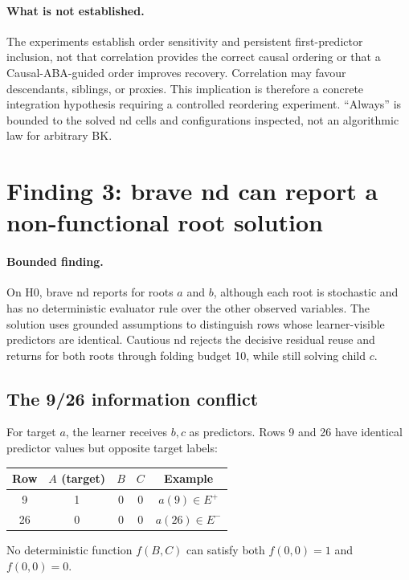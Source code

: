 \documentclass[11pt]{article}
\DeclareRobustCommand{\code}[1]{\texttt{\detokenize{#1}}}
\newcommand{\Epos}{E^{+}}
\newcommand{\Eneg}{E^{-}}
\newcommand{\finding}{\paragraph{Bounded finding.}}
\newcommand{\boundary}{\paragraph{What is not established.}}
\begin{document}
\boundary
The experiments establish order sensitivity and persistent first-predictor
inclusion, not that correlation provides the correct causal ordering or that a
Causal-ABA-guided order improves recovery. Correlation may favour descendants,
siblings, or proxies. This implication is therefore a concrete integration
hypothesis requiring a controlled reordering experiment. ``Always'' is bounded
to the solved nd cells and configurations inspected, not an algorithmic law
for arbitrary BK.

\section{Finding 3: brave nd can report a non-functional root solution}

\finding
On H0, brave nd reports \code{solved} for roots \(a\) and \(b\), although each
root is stochastic and has no deterministic evaluator rule over the other
observed variables. The solution uses grounded assumptions to distinguish rows
whose learner-visible predictors are identical. Cautious nd rejects the
decisive residual reuse and returns \code{completed_no_solution} for both roots
through folding budget 10, while still solving child \(c\).

\subsection{The 9/26 information conflict}

For target \(a\), the learner receives \(b,c\) as predictors. Rows 9 and 26
have identical predictor values but opposite target labels:

\begin{center}
\begin{tabular}{ccccc}
\toprule
Row & \(A\) (target) & \(B\) & \(C\) & Example \\
\midrule
9  & 1 & 0 & 0 & \(a(9)\in\Epos\) \\
26 & 0 & 0 & 0 & \(a(26)\in\Eneg\) \\
\bottomrule
\end{tabular}
\end{center}

No deterministic function \(f(B,C)\) can satisfy both
\(f(0,0)=1\) and \(f(0,0)=0\).
\end{document}
